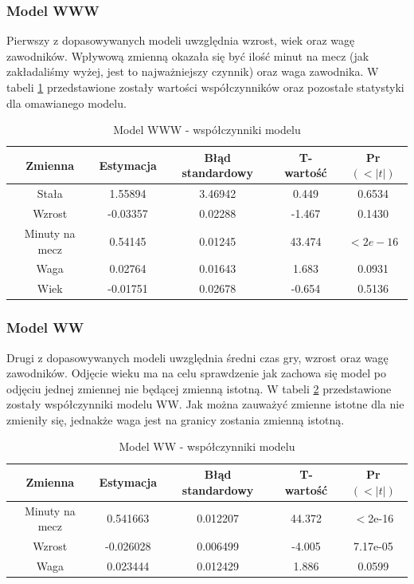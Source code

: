 \documentclass[11pt,a4paper]{article}
\begin{document}
\subsubsection{Model WWW}
Pierwszy z dopasowywanych modeli uwzględnia wzrost, wiek oraz wagę zawodników. Wpływową zmienną okazała się być ilość minut na mecz (jak zakładaliśmy wyżej, jest to najważniejszy czynnik) oraz waga zawodnika. W tabeli \ref{model_www} przedstawione zostały wartości współczynników oraz pozostałe statystyki dla omawianego modelu. 
\begin{table}[H]
	\begin{tabular}{| c | c | c | c | c |}
		\hline
		Zmienna & Estymacja & Błąd standardowy & T-wartość & Pr$(<|t|)$\\ \hline
		Stała & 1.55894  &  3.46942&   0.449&   0.6534    \\ \hline
		Wzrost &     -0.03357 &   0.02288 & -1.467  & 0.1430    \\ \hline
		Minuty na mecz &         0.54145  &  0.01245&  43.474  &$ <2e-16$\\ \hline
		Waga  &     0.02764    &0.01643 &  1.683  & 0.0931  \\ \hline
		Wiek   &      -0.01751  &  0.02678 & -0.654&   0.5136 \\ \hline
	\end{tabular}
	\caption{Model WWW - współczynniki modelu}
	\label{model_www}
\end{table}
\subsubsection{Model WW}
Drugi z dopasowywanych modeli uwzględnia średni czas gry, wzrost oraz wagę zawodników. Odjęcie wieku ma na celu sprawdzenie jak zachowa się model po odjęciu jednej zmiennej nie będącej zmienną istotną. W tabeli \ref{model_ww} przedstawione zostały współczynniki modelu WW. Jak można zauważyć zmienne istotne dla nie zmieniły się, jednakże waga jest na granicy zostania zmienną istotną.

\begin{table}[H]
	\begin{tabular}{| c | c | c | c | c |}
		\hline
		Zmienna & Estymacja & Błąd standardowy & T-wartość & Pr$(<|t|)$\\ \hline
		Minuty na mecz & 0.541663 & 0.012207 & 44.372 & $<$2e-16\\ \hline
		Wzrost & -0.026028 & 0.006499 & -4.005 & 7.17e-05 \\ \hline 
		Waga & 0.023444 & 0.012429 & 1.886 & 0.0599 \\ \hline
	\end{tabular}
	\caption{Model WW - współczynniki modelu}
	\label{model_ww}
\end{table}
\end{document}
